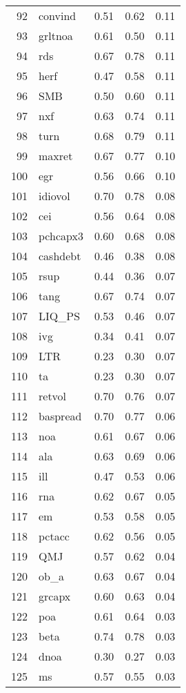 \documentclass[12pt]{article}
\begin{document}
\begin{footnotesize}
\begin{longtable}{rl|c|c|c}
  92 & convind & 0.51 & 0.62 & 0.11 \\ 
  93 & grltnoa & 0.61 & 0.50 & 0.11 \\ 
  94 & rds & 0.67 & 0.78 & 0.11 \\ 
  95 & herf & 0.47 & 0.58 & 0.11 \\ 
  96 & SMB & 0.50 & 0.60 & 0.11 \\ 
  97 & nxf & 0.63 & 0.74 & 0.11 \\ 
  98 & turn & 0.68 & 0.79 & 0.11 \\ 
  99 & maxret & 0.67 & 0.77 & 0.10 \\ 
  100 & egr & 0.56 & 0.66 & 0.10 \\ 
  101 & idiovol & 0.70 & 0.78 & 0.08 \\ 
  102 & cei & 0.56 & 0.64 & 0.08 \\ 
  103 & pchcapx3 & 0.60 & 0.68 & 0.08 \\ 
  104 & cashdebt & 0.46 & 0.38 & 0.08 \\ 
  105 & rsup & 0.44 & 0.36 & 0.07 \\ 
  106 & tang & 0.67 & 0.74 & 0.07 \\ 
  107 & LIQ\_PS & 0.53 & 0.46 & 0.07 \\ 
  108 & ivg & 0.34 & 0.41 & 0.07 \\ 
  109 & LTR & 0.23 & 0.30 & 0.07 \\ 
  110 & ta & 0.23 & 0.30 & 0.07 \\ 
  111 & retvol & 0.70 & 0.76 & 0.07 \\ 
  112 & baspread & 0.70 & 0.77 & 0.06 \\ 
  113 & noa & 0.61 & 0.67 & 0.06 \\ 
  114 & ala & 0.63 & 0.69 & 0.06 \\ 
  115 & ill & 0.47 & 0.53 & 0.06 \\ 
  116 & rna & 0.62 & 0.67 & 0.05 \\ 
  117 & em & 0.53 & 0.58 & 0.05 \\ 
  118 & pctacc & 0.62 & 0.56 & 0.05 \\ 
  119 & QMJ & 0.57 & 0.62 & 0.04 \\ 
  120 & ob\_a & 0.63 & 0.67 & 0.04 \\ 
  121 & grcapx & 0.60 & 0.63 & 0.04 \\ 
  122 & poa & 0.61 & 0.64 & 0.03 \\ 
  123 & beta & 0.74 & 0.78 & 0.03 \\ 
  124 & dnoa & 0.30 & 0.27 & 0.03 \\ 
  125 & ms & 0.57 & 0.55 & 0.03 \\ 

\end{longtable}
\end{footnotesize}
\end{document}
